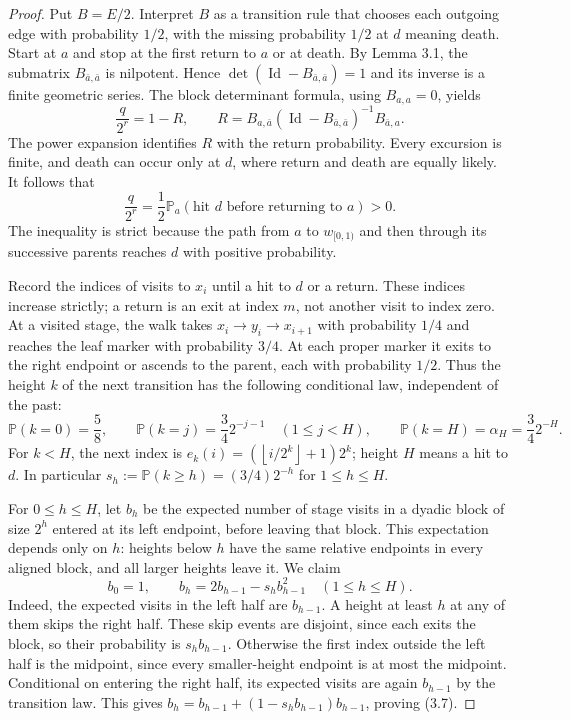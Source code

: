 \documentclass[reqno]{amsart}
\theoremstyle{remark}
\numberwithin{equation}{section}
\begin{document}
\begin{proof}
Put $B=E/2$.  Interpret $B$ as a transition rule that chooses each outgoing edge with
probability $1/2$, with the missing probability $1/2$ at $d$ meaning death.  Start at $a$ and
stop at the first return to $a$ or at death.  By Lemma 3.1, the submatrix
$B_{\bar a,\bar a}$ is nilpotent.  Hence
$\det(\operatorname{Id}-B_{\bar a,\bar a})=1$ and its inverse is a finite geometric series.
The block determinant formula, using $B_{a,a}=0$, yields
\[
\frac{q}{2^r}=1-R,
\qquad
R=B_{a,\bar a}(\operatorname{Id}-B_{\bar a,\bar a})^{-1}B_{\bar a,a}.
\tag{3.4}
\]
The power expansion identifies $R$ with the return probability.  Every excursion is finite, and
death can occur only at $d$, where return and death are equally likely.  It follows that
\[
\frac{q}{2^r}=\frac{1}{2}\mathbb P_a(\text{hit $d$ before returning to $a$})>0.
\tag{3.5}
\]
The inequality is strict because the path from $a$ to $w_{[0,1)}$ and then through its successive
parents reaches $d$ with positive probability.

Record the indices of visits to $x_i$ until a hit to $d$ or a return.  These indices increase
strictly; a return is an exit at index $m$, not another visit to index zero.  At a visited stage,
the walk takes $x_i\to y_i\to x_{i+1}$ with probability $1/4$ and reaches the leaf marker with
probability $3/4$.  At each proper marker it exits to the right endpoint or ascends to the parent,
each with probability $1/2$.  Thus the height $k$ of the next transition has the following
conditional law, independent of the past:
\[
\mathbb P(k=0)=\frac{5}{8},\qquad
\mathbb P(k=j)=\frac{3}{4}2^{-j-1}\quad(1\leq j<H),\qquad
\mathbb P(k=H)=\alpha_H=\frac{3}{4}2^{-H}.
\tag{3.6}
\]
For $k<H$, the next index is
$e_k(i)=\left(\left\lfloor i/2^k\right\rfloor+1\right)2^k$; height $H$ means a hit to $d$.
In particular $s_h:=\mathbb P(k\geq h)=(3/4)2^{-h}$ for $1\leq h\leq H$.

For $0\leq h\leq H$, let $b_h$ be the expected number of stage visits in a dyadic block of
size $2^h$ entered at its left endpoint, before leaving that block.  This expectation depends
only on $h$: heights below $h$ have the same relative endpoints in every aligned block, and all
larger heights leave it.  We claim
\[
b_0=1,\qquad b_h=2b_{h-1}-s_hb_{h-1}^2\quad(1\leq h\leq H).
\tag{3.7}
\]
Indeed, the expected visits in the left half are $b_{h-1}$.  A height at least $h$ at any of them
skips the right half.  These skip events are disjoint, since each exits the block, so their
probability is $s_hb_{h-1}$.  Otherwise the first index outside the left half is the midpoint,
since every smaller-height endpoint is at most the midpoint.  Conditional on entering the right
half, its expected visits are again $b_{h-1}$ by the transition law.  This gives
$b_h=b_{h-1}+(1-s_hb_{h-1})b_{h-1}$, proving (3.7).


\end{proof}
\end{document}
